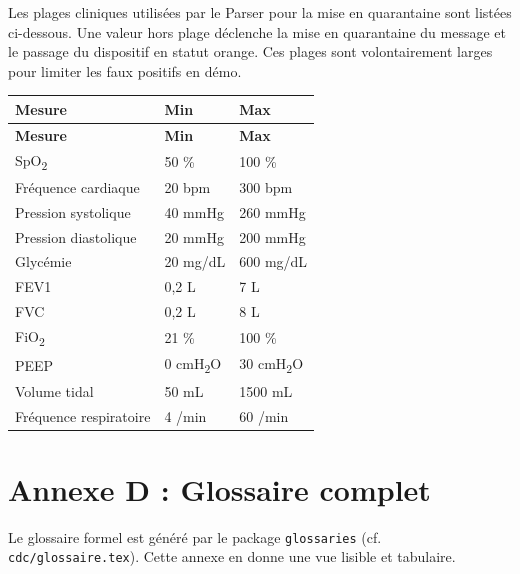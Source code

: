 Les plages cliniques utilisées par le Parser pour la mise en quarantaine sont listées ci-dessous. Une valeur hors plage déclenche la mise en quarantaine du message et le passage du dispositif en statut orange. Ces plages sont volontairement larges pour limiter les faux positifs en démo.

\bridgezebra
\begin{longtable}{p{6cm}p{3cm}p{3cm}}
  \toprule
  \rowcolor{bridgeblue!90}
  {\color{white}\bfseries Mesure} & {\color{white}\bfseries Min} & {\color{white}\bfseries Max} \\
  \midrule
  \endfirsthead
  \toprule
  \rowcolor{bridgeblue!90}
  {\color{white}\bfseries Mesure} & {\color{white}\bfseries Min} & {\color{white}\bfseries Max} \\
  \midrule
  \endhead
  \bottomrule
  \endfoot
  SpO\textsubscript{2} & 50 \% & 100 \% \\
  Fréquence cardiaque & 20 bpm & 300 bpm \\
  Pression systolique & 40 mmHg & 260 mmHg \\
  Pression diastolique & 20 mmHg & 200 mmHg \\
  Glycémie & 20 mg/dL & 600 mg/dL \\
  FEV1 & 0,2 L & 7 L \\
  FVC & 0,2 L & 8 L \\
  FiO\textsubscript{2} & 21 \% & 100 \% \\
  PEEP & 0 cmH\textsubscript{2}O & 30 cmH\textsubscript{2}O \\
  Volume tidal & 50 mL & 1500 mL \\
  Fréquence respiratoire & 4 /min & 60 /min \\
\end{longtable}

\section*{Annexe D : Glossaire complet}
\label{sec:annexe-glossaire}

Le glossaire formel est généré par le package \texttt{glossaries} (cf. \texttt{cdc/glossaire.tex}). Cette annexe en donne une vue lisible et tabulaire.


